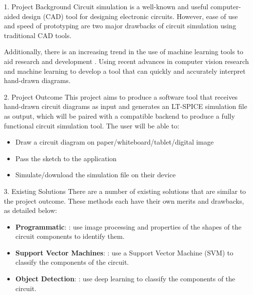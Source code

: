 \documentclass{beamer}
\date{\today}
\begin{document}
\begin{frame}[t]
  \begin{columns}[t]

    \separatorcolumn

    \begin{column}{\colwidth}
      \begin{block}{1. Project Background}
        Circuit simulation is a well-known and useful computer-aided design
        (CAD) tool for designing electronic circuits. However, ease of use and
        speed of prototyping are two major drawbacks of circuit simulation using
        traditional CAD tools.

        Additionally, there is an increasing trend in the use of machine learning
        tools to aid research and development \cite{review/Moreno-Garcia2019}.
        Using recent advances in computer vision research and machine learning to
        develop a tool that can quickly and accurately interpret hand-drawn diagrams.
      \end{block}


      \begin{block}{2. Project Outcome}
        This project aims to produce a software tool that receives hand-drawn
        circuit diagrams as input and generates an LT-SPICE simulation file as output,
        which will be paired with a compatible backend to produce a fully functional
        circuit simulation tool. The user will be able to:

        \begin{itemize}
          \item Draw a circuit diagram on paper/whiteboard/tablet/digital image
          \item Pass the sketch to the application
          \item Simulate/download the simulation file on their device
        \end{itemize}
      \end{block}


      \begin{block}{3. Existing Solutions}
        There are a number of existing solutions that are similar to the project
        outcome. These methods each have their own merits and drawbacks, as detailed
        below:

        \begin{itemize}
          \item \textbf{Programmatic}:
                \cite{}: use image processing and properties of the shapes of
                the circuit components to identify them.
          \item \textbf{Support Vector Machines}:
                \cite{}: use a Support Vector Machine (SVM) to classify the components
                of the circuit.
          \item \textbf{Object Detection}: \cite{dl/Rachala2022,dl/Dey2021}: use deep learning to classify
                the components of the circuit.
        \end{itemize}


\end{block}
\end{column}
\end{columns}
\end{frame}
\end{document}
